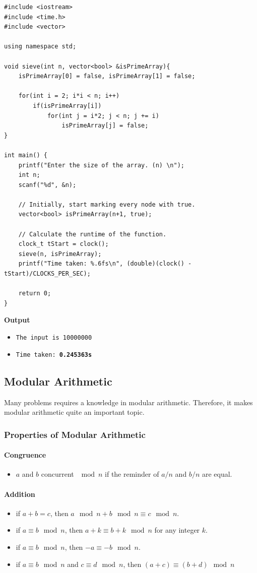 \documentclass[12pt]{article}
\begin{document}
\begin{verbatim}
#include <iostream>
#include <time.h>
#include <vector>

using namespace std;

void sieve(int n, vector<bool> &isPrimeArray){
    isPrimeArray[0] = false, isPrimeArray[1] = false;
    
    for(int i = 2; i*i < n; i++)
        if(isPrimeArray[i])
            for(int j = i*2; j < n; j += i)
                isPrimeArray[j] = false;
}

int main() {
    printf("Enter the size of the array. (n) \n");
    int n;
    scanf("%d", &n);
    
    // Initially, start marking every node with true.
    vector<bool> isPrimeArray(n+1, true);
    
    // Calculate the runtime of the function.
    clock_t tStart = clock();
    sieve(n, isPrimeArray);
    printf("Time taken: %.6fs\n", (double)(clock() - tStart)/CLOCKS_PER_SEC);
    
    return 0;
}
\end{verbatim}

\clearpage
\textbf{Output}
\begin{itemize}
  \item \texttt{The input is 10000000} 
  \item \texttt{Time taken: \textbf{0.245363s}} 
\end{itemize}
\subsection{Modular Arithmetic}
Many problems requires a knowledge in modular arithmetic. Therefore, it makes modular arithmetic quite an important topic. 

\subsubsection{Properties of Modular Arithmetic}
\paragraph{\textbf{Congruence}}
\begin{itemize}
  \item $a$ and $b$ concurrent $\mod{n}$ if the reminder of $a/n$ and $b/n$ are equal.
\end{itemize}
\paragraph{\textbf{Addition}}
\begin{itemize}
  \item if $a + b = c$, then $a \mod{n} + b \mod{n} \equiv c \mod{n}$.
  \item if $a \equiv b \mod{n}$, then $a + k \equiv b + k \mod{n}$ for any integer $k$.
  \item if $a \equiv b \mod{n}$, then $-a \equiv -b \mod{n}$.
  \item if $a \equiv b \mod{n}$ and $c \equiv d \mod{n}$, then $(a + c) \equiv (b + d) \mod{n}$
\end{itemize}
\end{document}
